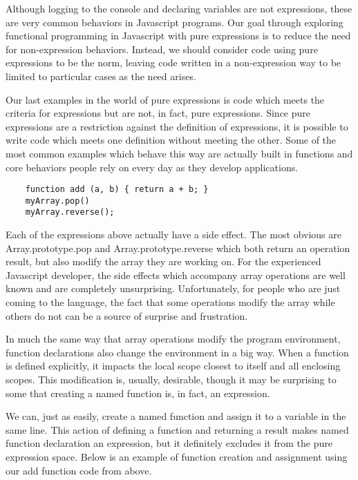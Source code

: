 \documentclass[a4paper,12pt,twoside]{book}
\begin{document}
 Although logging to the console and declaring variables are not expressions, these are very common behaviors in Javascript programs. Our goal through exploring functional programming in Javascript with pure expressions is to reduce the need for non-expression behaviors. Instead, we should consider code using pure expressions to be the norm, leaving code written in a non-expression way to be limited to particular cases as the need arises.
 
 Our last examples in the world of pure expressions is code which meets the criteria for expressions but are not, in fact, pure expressions.  Since pure expressions are a restriction against the definition of expressions, it is possible to write code which meets one definition without meeting the other. Some of the most common examples which behave this way are actually built in functions and core behaviors people rely on every day as they develop applications.
 
\begin{lstlisting}
    function add (a, b) { return a + b; }
    myArray.pop()
    myArray.reverse();
\end{lstlisting}
 
 Each of the expressions above actually have a side effect. The most obvious are Array.prototype.pop and Array.prototype.reverse which both return an operation result, but also modify the array they are working on.  For the experienced Javascript developer, the side effects which accompany array operations are well known and are completely unsurprising. Unfortunately, for people who are just coming to the language, the fact that some operations modify the array while others do not can be a source of surprise and frustration.
 
 In much the same way that array operations modify the program environment, function declarations also change the environment in a big way. When a function is defined explicitly, it impacts the local scope closest to itself and all enclosing scopes. This modification is, usually, desirable, though it may be surprising to some that creating a named function is, in fact, an expression.
 
 We can, just as easily, create a named function and assign it to a variable in the same line. This action of defining a function and returning a result makes named function declaration an expression, but it definitely excludes it from the pure expression space.  Below is an example of function creation and assignment using our add function code from above.
\end{document}
